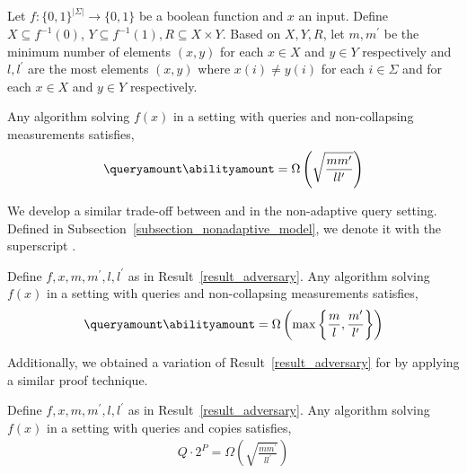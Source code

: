 \begin{result}\label{result_adversary}
    Let $f:\{0,1\}^{|\Sigma|}\rightarrow \{0,1\}$ be a boolean function and $x$ an input.
    Define $X\subseteq f^{-1}(0)$, $Y\subseteq f^{-1}(1), R\subseteq X\times Y$. Based on $X,Y, R$, let $m, m^\prime$ be the minimum number of elements $(x,y)$ for each $x\in X$ and $y\in Y$ respectively and $l,l^{\prime}$ are the most elements $(x,y)$ where $x(i)\neq y(i)$ for each $i\in\Sigma$ and for each $x\in X$ and $y\in Y$ respectively.

    Any algorithm solving $f(x)$ in a \pdqpname setting with \queryamount queries and \abilityamount non-collapsing measurements satisfies,
    \begin{align*}
        \queryamount \abilityamount = \Omega \left( \sqrt{\frac{mm^\prime}{ll^\prime}} \right)
    \end{align*}
\end{result}

We develop a similar trade-off between \queryamount and \abilityamount in the non-adaptive query setting. Defined in Subsection~\ref{subsection_nonadaptive_model}, we denote it with the superscript \nonadaptivelabel.

\begin{result}
    Define $f, x, m, m^\prime, l, l^\prime$ as in Result~\ref{result_adversary}. Any algorithm solving $f(x)$ in a \pdqpnaqname setting with \queryamount queries and \abilityamount non-collapsing measurements satisfies,
    \begin{align*}
        \queryamount \abilityamount = \Omega \left(\max \left\{ \frac{m}{l}, \frac{m^\prime}{l^\prime} \right\} \right)
    \end{align*}
\end{result}

Additionally, we obtained a variation of Result~\ref{result_adversary} for \copybqpname by applying a similar proof technique.

\begin{result}\label{result_copy}
    Define $f, x, m, m^\prime, l, l^\prime$ as in Result~\ref{result_adversary}. Any algorithm solving $f(x)$ in a \copybqpname setting with \queryamount queries and \abilityamount copies satisfies,
    \begin{align*}
        Q \cdot 2^P = \Omega \left( \sqrt{\frac{mm^\prime}{ll^\prime}} \right)
    \end{align*}
\end{result}

